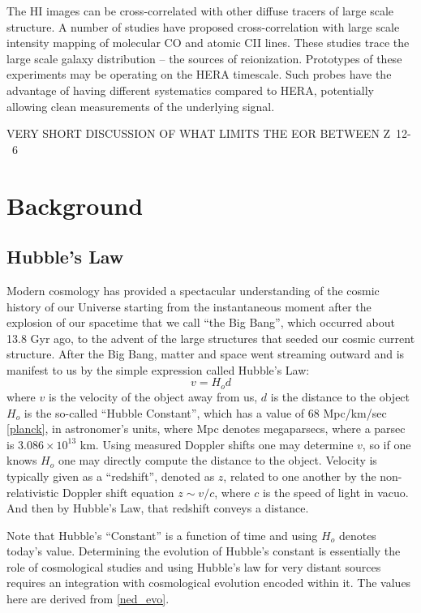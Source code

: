 \documentclass[ars]{copernicus}
\begin{document}
The HI images can be cross-correlated with other diffuse tracers of large scale
structure. A number of studies have proposed cross-correlation with large scale
intensity mapping of molecular CO \cite{lidz_et_al2011} and atomic CII
\citep{gong_et_al2011} lines. These studies trace the large scale galaxy distribution
-- the sources of reionization. Prototypes of these experiments may be operating on
the HERA timescale. Such probes have the advantage of having different systematics
compared to HERA, potentially allowing clean measurements of the underlying signal.


VERY SHORT DISCUSSION OF WHAT LIMITS THE EOR BETWEEN Z~12-~6

\section{Background}
\label{sec:background}
\subsection{Hubble's Law}
\label{sec:hubble}
Modern cosmology has provided a spectacular understanding of the cosmic history of
our Universe starting from the instantaneous moment after the explosion of our
spacetime that we call ``the Big Bang'', which occurred about 13.8 Gyr ago, to the
advent of the large structures that seeded our cosmic current structure. After the
Big Bang, matter and space went streaming outward and is manifest to us by the simple
expression called Hubble's Law:
\begin{equation}
v = H_od
\end{equation}
where $v$ is the velocity of the object away from us, $d$ is the distance to the
object $H_o$ is the so-called ``Hubble Constant'', which has a value of 68 Mpc/km/sec
\ref{planck}, in astronomer's units, where Mpc denotes megaparsecs, where a parsec is
$3.086 \times 10^13$ km. Using measured Doppler shifts one may determine $v$, so if one
knows $H_o$ one may directly compute the distance to the object. Velocity is
typically given as a ``redshift'', denoted as $z$, related to one another by the
non-relativistic Doppler shift equation $z \sim v/c$, where $c$ is the speed of light
in vacuo. And then by Hubble's Law, that redshift conveys a distance.

Note that Hubble's ``Constant'' is a function of time and using $H_o$ denotes today's
value. Determining the evolution of Hubble's constant is essentially the role of
cosmological studies and using Hubble's law for very distant sources requires an
integration with cosmological evolution encoded within it. The values here are
derived from \ref{ned_evo}.
\end{document}
